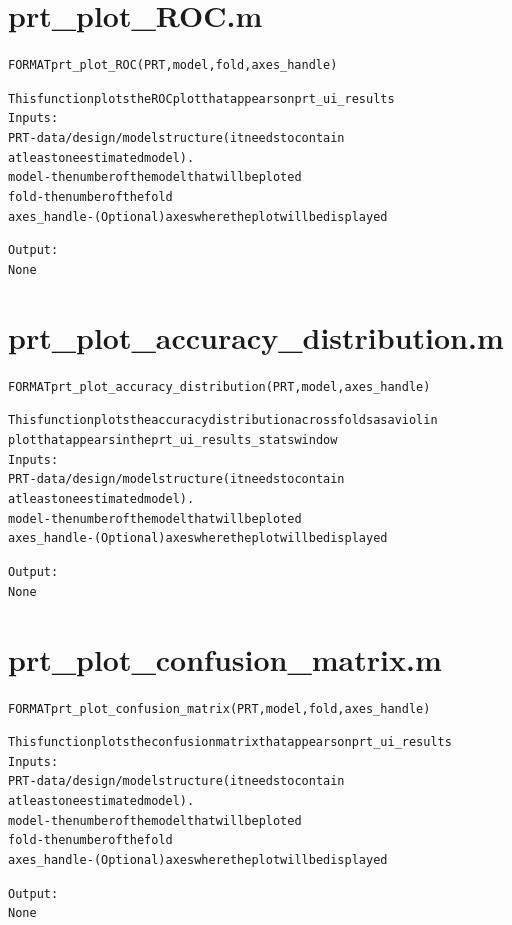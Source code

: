 \section{prt\_plot\_ROC.m}
\begin{alltt}

 FORMAT prt\_plot\_ROC(PRT, model, fold, axes\_handle)
 
 This function plots the ROC plot that appears on prt\_ui\_results 
 Inputs:
       PRT             - data/design/model structure (it needs to contain
                         at least one estimated model).
       model           - the number of the model that will be ploted
       fold            - the number of the fold
       axes\_handle     - (Optional) axes where the plot will be displayed
 
 Output:
       None        
\end{alltt}


\section{prt\_plot\_accuracy\_distribution.m}
\begin{alltt}

 FORMAT prt\_plot\_accuracy\_distribution(PRT, model, axes\_handle)
 
 This function plots the accuracy distribution across folds as a violin
 plot that appears in the prt\_ui\_results\_stats window
 Inputs:
       PRT             - data/design/model structure (it needs to contain
                         at least one estimated model).
       model           - the number of the model that will be ploted
       axes\_handle     - (Optional) axes where the plot will be displayed
 
 Output:
       None        
\end{alltt}


\section{prt\_plot\_confusion\_matrix.m}
\begin{alltt}

 FORMAT prt\_plot\_confusion\_matrix(PRT, model, fold, axes\_handle)
 
 This function plots the confusion matrix that appears on prt\_ui\_results
 Inputs:
       PRT             - data/design/model structure (it needs to contain
                         at least one estimated model).
       model           - the number of the model that will be ploted
       fold            - the number of the fold
       axes\_handle     - (Optional) axes where the plot will be displayed
 
 Output:
       None
\end{alltt}


